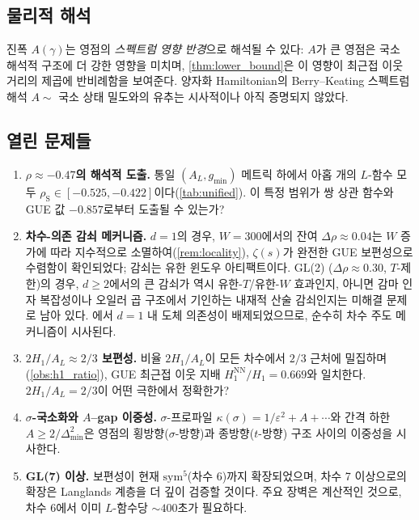 \documentclass[11pt,a4paper]{article}
\theoremstyle{plain}
\theoremstyle{definition}
\begin{document}
\subsection{물리적 해석}

진폭 $A(\gamma)$는 영점의
\emph{스펙트럼 영향 반경}으로 해석될 수 있다:
$A$가 큰 영점은 국소 해석적 구조에 더 강한 영향을 미치며,
\cref{thm:lower_bound}은 이 영향이 최근접 이웃 거리의 제곱에
반비례함을 보여준다.
양자화 Hamiltonian의 Berry--Keating 스펙트럼 해석
$A \sim$ 국소 상태 밀도와의 유추는 시사적이나
아직 증명되지 않았다.

\subsection{열린 문제들}

\begin{enumerate}
  \item \textbf{$\rho \approx -0.47$의 해석적 도출.}\;
        통일 $(A_L, g_{\min})$ 메트릭 하에서 아홉 개의 $L$-함수 모두
        $\rho_{\mathrm{S}} \in [-0.525, -0.422]$이다(\cref{tab:unified}).
        이 특정 범위가 쌍 상관 함수와 GUE 값 $-0.857$로부터 도출될 수 있는가?
  \item \textbf{차수-의존 감쇠 메커니즘.}\;
        $d = 1$의 경우, $W = 300$에서의 잔여 $\Delta\rho \approx 0.04$는
        $W$ 증가에 따라 지수적으로 소멸하여(\cref{rem:locality}),
        $\zeta(s)$가 완전한 GUE 보편성으로 수렴함이 확인되었다; 감쇠는
        유한 윈도우 아티팩트이다. GL(2)
        ($\Delta\rho \approx 0.30$, $T$-제한)의 경우,
        $d \ge 2$에서의 큰 감쇠가 역시 유한-$T$/유한-$W$ 효과인지,
        아니면 감마 인자 복잡성이나 오일러 곱 구조에서 기인하는
        내재적 산술 감쇠인지는 미해결 문제로 남아 있다.
        에서 $d = 1$ 내 도체 의존성이
        배제되었으므로, 순수히 차수 주도 메커니즘이 시사된다.
  \item \textbf{$2H_1/A_L \approx 2/3$ 보편성.}\;
        비율 $2H_1/A_L$이 모든 차수에서 $2/3$ 근처에 밀집하며(\cref{obs:h1_ratio}),
        GUE 최근접 이웃 지배 $H_1^{\mathrm{NN}}/H_1 = 0.669$와 일치한다.
        $2H_1/A_L = 2/3$이 어떤 극한에서 정확한가?
  \item \textbf{$\sigma$-국소화와 $A$--gap 이중성.}\;
        $\sigma$-프로파일 $\kappa(\sigma) = 1/\varepsilon^2 + A + \cdots$와
        간격 하한 $A \ge 2/\Delta_{\min}^2$은
        영점의 횡방향($\sigma$-방향)과 종방향($t$-방향) 구조 사이의
        이중성을 시사한다.
  \item \textbf{GL(7) 이상.}\;
        보편성이 현재 $\mathrm{sym}^5$(차수 6)까지 확장되었으며,
        차수 7 이상으로의 확장은 Langlands 계층을 더 깊이 검증할 것이다.
        주요 장벽은 계산적인 것으로, 차수 6에서 이미 $L$-함수당
        ${\sim}400$초가 필요하다.
\end{enumerate}
\end{document}
